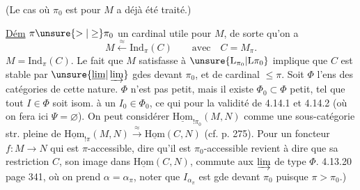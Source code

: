 (Le cas où $\pi_0$ est  pour $M$ a déjà été traité.)

\uline{Dém}    $\pi\unsure{>|\geq}\pi_0$ un cardinal  utile pour $M$, de sorte qu'on a
\[
M\xleftarrow{\approx}\mathrm{Ind}_{\pi}(C)\qquad\text{avec}\quad C=M_{\pi}.
\]
 $M=\mathrm{Ind}_{\pi}(C)$.  Le fait que $M$ satisfasse à $\unsure{\mathrm L_{\pi_0}|\mathrm L\pi_0}$ implique que $C$ est stable par $\unsure{\underline{\lim}|\varinjlim}$ gdes devant $\pi_0$, et de cardinal $\leq\pi$. Soit $\Phi$ l'ens des catégories de cette nature. \deleted{\unsure{$\xi$}} $\Phi$ n'est pas petit, mais il existe $\Phi_0\subset\Phi$  petit, tel que tout $I\in\Phi$ soit isom. à un $I_0\in\Phi_0$, ce qui  pour la validité de 4.14.1 et 4.14.2 (où on fera ici $\Psi=\varnothing$). On  peut considérer $\underline{\mathrm{Hom}}_{!\pi_0}(M,N)$ comme une  sous-catégorie str. pleine de $\underline{\mathrm{Hom}}_{!\pi}(M,N)\xrightarrow{\approx}\underline{\mathrm{Hom}}(C,N)$ (cf.  p. 275). Pour un foncteur $f:M\longrightarrow N$ qui est $\pi$-accessible, dire qu'il est \inserted{$=$} $\pi_0$-accessible revient à dire que sa restriction  $C$,  son image dans $\underline{\mathrm{Hom}}(C,N)$,  commute aux $\varinjlim$ de type $\Phi$.  4.13.20
 page 341, où on prend $\alpha=\alpha_{\pi}$, noter que $I_{\alpha_\pi}$ est gde devant $\pi_0$ puisque $\pi>\pi_0$.)
